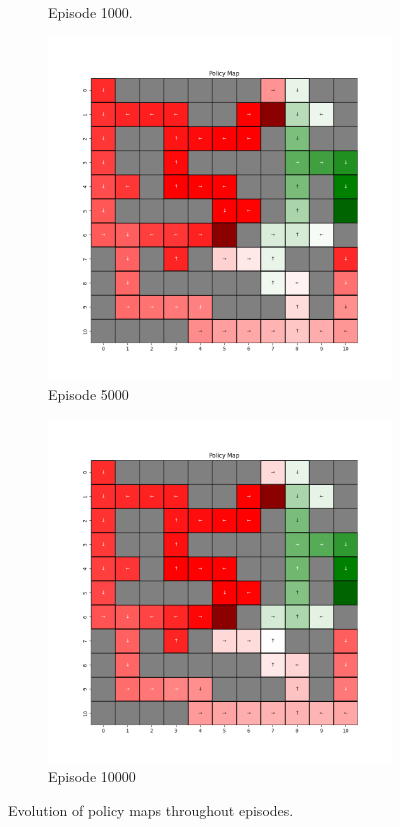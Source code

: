 \documentclass{assignment}
\begin{document}
\begin{figure}[H]
\begin{subfigure}{0.3\textwidth}
    \caption{Episode 1000.}
    \end{subfigure}\hfill
    \begin{subfigure}{0.3\textwidth}
        \includegraphics[width=\textwidth]{figures/policy_q/alpha_sweep/policy_alpha_0.5_gamma_0.95_epsilon_0.2_iteration_5000.png}
    \caption{Episode 5000}
    \end{subfigure}\hfill
    \begin{subfigure}{0.3\textwidth}
        \includegraphics[width=\textwidth]{figures/policy_q/alpha_sweep/policy_alpha_0.5_gamma_0.95_epsilon_0.2_iteration_10000.png}
    \caption{Episode 10000}
    \end{subfigure}
    \caption{Evolution of policy maps throughout episodes.}
    \label{fig:alpha_0.5_q_learning_policy}
\end{figure}
\end{document}
